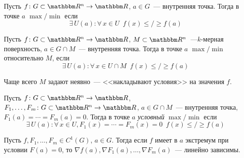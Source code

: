 \documentclass[12pt,timbord]{../../../notes}
\begin{document}
\begin{defn}\label{defn:diffspace::condextremahandwave::extrema}
  Пусть $f\colon G \subset \R^n \to \R$, $a\in G$~--- внутренняя точка. Тогда в точке $a$
  $\max/\min$ если
  \[
    \exists\, U(a) \colon \forall\, x\in U \;\: f(x) \leqslant/\geqslant f(a)
  \]
\end{defn}
\begin{defn}\label{defn:diffspace::condextremahandwave::subsetextrema}
  Пусть $f\colon G \subset \R^n \to \R$, $M\subset\R^n$~---$k$-мерная поверхность,
  $a\in G\cap M$~--- внутренняя точка. Тогда в точке $a$
  $\max/\min$ относительно $M$, если
  \[
    \exists\, U(a) \colon \forall\, x\in U\cap M \;\: f(x) \leqslant/\geqslant f(a)
  \]
\end{defn}

Чаще всего $M$ задают неявно~--- <<накладывают условия>> на значения $f$.

\begin{defn}\label{defn:diffspace::condextremahandwave::condextrema}
  Пусть $f\colon G \subset \R^n \to \R$, $F_1, \dotsc, F_m \colon G \subset \R^n \to \R$,
  $a\in G\cap M$~--- внутренняя точка, $F_1(a) = \dotsb = F_m(a) = 0$.
  Тогда в точке $a$ \emph{условный} $\max/\min$ если
  \[
    \exists\, U(a) \colon \forall\, x\in U, F_1(x) = \dotsb = F_m(x) = 0\;\: 
    f(x) \leqslant/\geqslant f(a)
  \]
\end{defn}

\begin{thrm}\label{thrm:diffspace::condextrema}
  Пусть $f, F_1, \dotsc, F_m \in C^1(G)$, $a\in G$. Тогда если $f$ имеет в $a$ экстремум при условии
  $F(a) = 0$, то $\nabla f(a), \nabla F_1(a), \dotsc, \nabla F_m(a)$~--- линейно зависимы.
\end{thrm}
\end{document}
